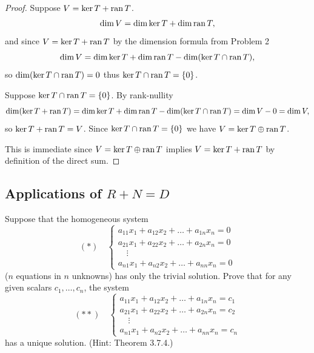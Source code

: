 \begin{proof}
    Suppose $V = \ker T + \operatorname{ran} T$.
    \[\dim V = \dim \ker T + \dim \operatorname{ran} T,\]
    and since $V = \ker T + \operatorname{ran} T$ by the dimension formula from Problem 2
    \[\dim V = \dim \ker T + \dim \operatorname{ran} T - \dim(\ker T \cap \operatorname{ran} T),\]
    so $\dim(\ker T \cap \operatorname{ran} T) = 0$ thus $\ker T \cap \operatorname{ran} T = \{0\}$.

    Suppose $\ker T \cap \operatorname{ran} T = \{0\}$. By rank-nullity
    \[\dim(\ker T + \operatorname{ran} T) = \dim \ker T + \dim \operatorname{ran} T - \dim(\ker T \cap \operatorname{ran} T) = \dim V - 0 = \dim V,\]
    so $\ker T + \operatorname{ran} T = V$. Since $\ker T \cap \operatorname{ran} T = \{0\}$ we have 
    $V = \ker T \oplus \operatorname{ran} T$.

    This is immediate since $V = \ker T \oplus \operatorname{ran} T$ implies $V = \ker T + \operatorname{ran} T$
    by definition of the direct sum.
\end{proof}

\subsection{Applications of $R + N = D$}

\begin{tcolorbox}[title=Problem 1, breakable]
    Suppose that the homogeneous system
    \[(*) \quad \begin{cases} a_{11}x_1 + a_{12}x_2 + \ldots + a_{1n}x_n = 0 \\ a_{21}x_1 + a_{22}x_2 + \ldots + a_{2n}x_n = 0 \\ \quad \vdots \\ a_{n1}x_1 + a_{n2}x_2 + \ldots + a_{nn}x_n = 0 \end{cases}\]
    ($n$ equations in $n$ unknowns) has only the trivial solution. Prove that for 
    any given scalars $c_1, \ldots, c_n$, the system
    \[(**) \quad \begin{cases} a_{11}x_1 + a_{12}x_2 + \ldots + a_{1n}x_n = c_1 \\ a_{21}x_1 + a_{22}x_2 + \ldots + a_{2n}x_n = c_2 \\ \quad \vdots \\ a_{n1}x_1 + a_{n2}x_2 + \ldots + a_{nn}x_n = c_n \end{cases}\]
    has a unique solution. (Hint: Theorem 3.7.4.)
\end{tcolorbox}

